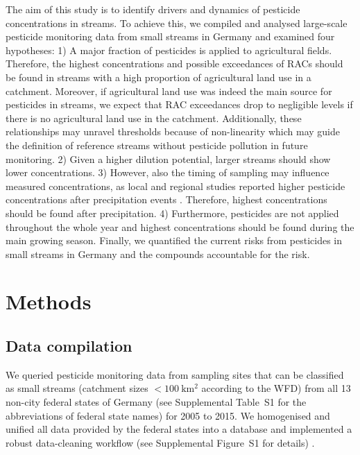 \documentclass[journal=esthag,manuscript=article]{achemso}
\begin{document}
The aim of this study is to identify drivers and dynamics of pesticide concentrations in streams.
To achieve this, we compiled and analysed large-scale pesticide monitoring data from small streams in Germany and examined four hypotheses:
1) A major fraction of pesticides is applied to agricultural fields.
Therefore, the highest concentrations and possible exceedances of RACs should be found in streams with a high proportion of agricultural land use in a catchment. 
Moreover, if agricultural land use was indeed the main source for pesticides in streams, we expect that RAC exceedances drop to negligible levels if there is no agricultural land use in the catchment. 
Additionally, these relationships may unravel thresholds because of non-linearity which may guide the definition of reference streams without pesticide pollution in future monitoring. 
2) Given a higher dilution potential, larger streams should show lower concentrations.
3) However, also the timing of sampling may influence measured concentrations,
as local and regional studies reported higher pesticide concentrations after precipitation events \citep{liess_determination_1999,Xing_Chow_Rees_Meng_Li_Ernst_Benoy_Zha_Hewitt_2013}. 
Therefore, highest concentrations should be found after precipitation. 
4) Furthermore, pesticides are not applied throughout the whole year and highest concentrations should be found during the main growing season.
Finally, we quantified the current risks from pesticides in small streams in Germany and the compounds accountable for the risk. 



\section{Methods}
\subsection{Data compilation}
We queried pesticide monitoring data from sampling sites that can be classified as small streams (catchment sizes $\mathrm{< 100~km^2}$ according to the WFD) from all 13 non-city federal states of Germany (see Supplemental Table~S1 for the abbreviations of federal state names) for 2005 to 2015.
We homogenised and unified all data provided by the federal states into a database and implemented a robust data-cleaning workflow (see Supplemental Figure~S1 for details) \citep{poisot_best_2015}.
\end{document}
